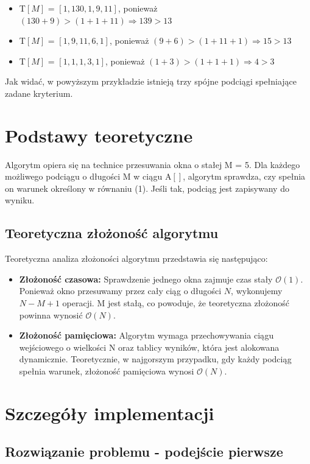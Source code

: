 \documentclass[12pt]{article}
\begin{document}
\begin{itemize}
	\item T$[M]$ = $[1, 130, 1, 9, 11]$, ponieważ $(130 + 9) > (1 + 1 + 11) \Rightarrow 139 > 13$
	\item T$[M]$ = $[1, 9, 11, 6, 1]$, ponieważ $(9 + 6) > (1 + 11 + 1) \Rightarrow 15 > 13$
	\item T$[M]$ = $[1, 1, 1, 3, 1]$, ponieważ $(1 + 3) > (1 + 1 + 1) \Rightarrow 4 > 3$
\end{itemize}

Jak widać, w powyższym przykładzie istnieją trzy spójne podciągi spełniające zadane kryterium.

\section{Podstawy teoretyczne}

Algorytm opiera się na technice przesuwania okna o stałej M = 5. Dla każdego możliwego podciągu o długości M w ciągu A$[]$, algorytm sprawdza, czy spełnia on warunek określony w równaniu (1). Jeśli tak, podciąg jest zapisywany do wyniku.
\subsection{Teoretyczna złożoność algorytmu}
Teoretyczna analiza złożoności algorytmu przedstawia się następująco:
\begin{itemize}
    \item {\bfseries Złożoność czasowa:} Sprawdzenie jednego okna zajmuje czas stały \textbf{$\mathcal{O}(1)$}. Ponieważ okno przesuwamy przez cały ciąg o długości $N$, wykonujemy $N-M+1$ operacji. M jest stałą, co powoduje, że teoretyczna złożoność powinna wynosić \textbf{$\mathcal{O}(N)$}.
    \item {\bfseries Złożoność pamięciowa:} Algorytm wymaga przechowywania ciągu wejściowego o wielkości N oraz tablicy wyników, która jest alokowana dynamicznie. Teoretycznie, w najgorszym przypadku, gdy każdy podciąg spełnia warunek, złożoność pamięciowa wynosi \textbf{$\mathcal{O}(N)$}.
\end{itemize}

\section{Szczegóły implementacji}
\subsection{Rozwiązanie problemu - podejście pierwsze}
\end{document}
